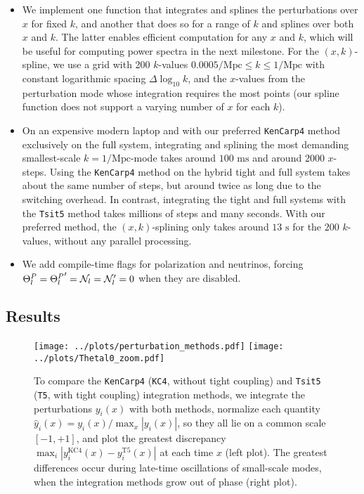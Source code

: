 \documentclass[10pt,a4paper]{article}
\begin{document}
\begin{itemize}
\item
We implement one function that integrates and splines the perturbations over $x$ for fixed $k$,
and another that does so for a range of $k$ and splines over both $x$ and $k$.
The latter enables efficient computation for any $x$ and $k$,
which will be useful for computing power spectra in the next milestone.
For the $(x,k)$-spline,
we use a grid with 200 $k$-values $0.0005 / \textrm{Mpc} \leq k \leq 1 / \textrm{Mpc}$ with constant logarithmic spacing $\Delta \log_{10} k$,
and the $x$-values from the perturbation mode whose integration requires the most points (our spline function does not support a varying number of $x$ for each $k$).

\item
On an expensive modern laptop and with our preferred \texttt{KenCarp4} method exclusively on the full system,
integrating and splining the most demanding smallest-scale $k=1/\textrm{Mpc}$-mode
takes around $100 \textrm{ ms}$ and around $2000$ $x$-steps.
Using the \texttt{KenCarp4} method on the hybrid tight and full system takes about the same number of steps,
but around twice as long due to the switching overhead.
In contrast, integrating the tight and full systems with the \texttt{Tsit5} method takes millions of steps and many seconds.
With our preferred method, the $(x,k)$-splining only takes around $13 \textrm{ s}$ for the $200$ $k$-values, without any parallel processing.

\item
We add compile-time flags for polarization and neutrinos,
forcing $\Theta^P_l = {\Theta^P_l}^\prime = \mathcal{N}_l = \mathcal{N}_l^\prime = 0$ when they are disabled.
\end{itemize}

\subsection{Results}

\begin{figure}
\texttt{[image: ../plots/perturbation\_methods.pdf]}
\hfill
\texttt{[image: ../plots/Thetal0\_zoom.pdf]}
\caption{To compare the \texttt{KenCarp4} (\texttt{KC4}, without tight coupling) and \texttt{Tsit5} (\texttt{T5}, with tight coupling) integration methods,
we integrate the perturbations $y_i(x)$ with both methods,
normalize each quantity $\hat{y}_i(x) = y_i(x) / \max_x |y_i(x)|$, so they all lie on a common scale $[-1, +1]$,
and plot the greatest discrepancy $\max_i |y^\text{KC4}_i(x) - y^\text{T5}_i(x)|$ at each time $x$ (left plot).
The greatest differences occur during late-time oscillations of small-scale modes, when the integration methods grow out of phase (right plot).}
\label{fig_perturb_methods}
\end{figure}
\end{document}
